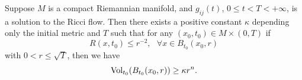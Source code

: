 \begin{theorem}
  \label{thm:cz-scale-local-no-collapsing}
Suppose $M$ is a compact Riemannian manifold, and $g_{ij}(t)$,
$0\leq t<T<+\infty$, is a solution to the Ricci flow. Then there
exists a positive constant $\kappa$ depending only the initial
metric and $T$ such that for any $(x_0,t_0)\in M\times(0,T)$ if
$$
R(x,t_0)\leq r^{-2},\ \ \ \forall x\in B_{t_0}(x_0,r)
$$
with $0<r\leq\sqrt{T}$, then we have
$$
{\rm Vol}_{t_0}(B_{t_0}(x_0,r))\geq\kappa r^n.
$$
\end{theorem}

